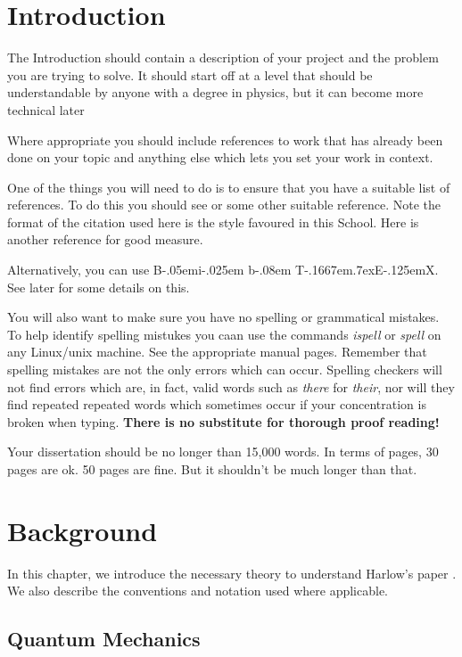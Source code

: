 \documentclass[12pt,a4paper]{report}
\def\BibTeX{{\rm B\kern-.05em{\sc i\kern-.025em b}\kern-.08em
    T\kern-.1667em\lower.7ex\hbox{E}\kern-.125emX}}
\begin{document}
\tableofcontents
\listoftables
\listoffigures


\chapter{Introduction}
The Introduction should contain a description of your project and the
problem you are trying to solve. It should start off at a level that
should be understandable by anyone with a degree in physics, but it
can become more technical later

Where appropriate you should include references to work that has
already been done on your topic and anything else which lets you set
your work in context.

One of the things you will need to do is to ensure that you have a
suitable list of references.  To do this you should see \cite{ref:lam}
or some other suitable reference.  Note the format of the citation used
here is the style favoured in this School.  Here is another
reference \cite{ref:bloggs} for good measure.

Alternatively, you can use \BibTeX. See later for some details on this.

You will also want to make sure you have no spelling or grammatical
mistakes. To help identify spelling mistukes you caan use the
commands \emph{ispell} or \emph{spell} on any Linux/unix machine. See
the appropriate manual pages. Remember that spelling mistakes are not
the only errors which can occur. Spelling checkers will not find
errors which are, in fact, valid words such as \emph{there} for {\em
  their}, nor will they find repeated repeated words which sometimes
occur if your concentration is broken when typing. \textbf{There is no
  substitute for thorough proof reading!}

Your dissertation should be no longer than 15,000 words. In terms of
pages, 30 pages are ok. 50 pages are fine. But it shouldn't be
much longer than that.


\chapter{Background}

In this chapter, we introduce the necessary theory to understand Harlow's paper \cite{Harlow}. We also describe the conventions and notation used where applicable.

\section{Quantum Mechanics}
\end{document}
